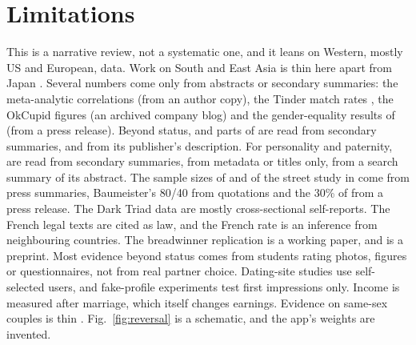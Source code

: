 \documentclass[conference,a4paper]{IEEEtran}
\begin{document}
\section{Limitations}
This is a narrative review, not a systematic one, and it leans on Western, mostly US and European, data. Work on South and East Asia is thin here apart from Japan \cite{raymo2005}. Several numbers come only from abstracts or secondary summaries: the meta-analytic correlations \cite{eastwick2014} (from an author copy), the Tinder match rates \cite{tyson2016}, the OkCupid figures \cite{rudder2009} (an archived company blog) and the gender-equality results of \cite{zentner2012} (from a press release). Beyond status, \cite{stulp2013paid,sorokowski2008,gignac2018,taylor2005} and parts of \cite{mautz2013} are read from secondary summaries, and \cite{curington2021} from its publisher's description. For personality and paternity, \cite{paulhus2002,jonason2015birds,holtzman2010,paulhus1998,jonason2010poach,brewer2015,burger1999,urbaniak2003,mcdaniel2005,marcinkowska2015} are read from secondary summaries, \cite{qureshi2016,lyons2016faces} from metadata or titles only, \cite{aitken2013} from a search summary of its abstract. The sample sizes of \cite{haslam2015} and of the street study in \cite{dufner2013} come from press summaries, Baumeister's 80/40 \cite{baumeister2010} from quotations and the 30\% of \cite{anderson2006} from a press release. The Dark Triad data are mostly cross-sectional self-reports. The French legal texts are cited as law, and the French rate is an inference from neighbouring countries. The breadwinner replication \cite{rosenberg2024} is a working paper, and \cite{xia2014} is a preprint. Most evidence beyond status comes from students rating photos, figures or questionnaires, not from real partner choice. Dating-site studies use self-selected users, and fake-profile experiments test first impressions only. Income is measured after marriage, which itself changes earnings. Evidence on same-sex couples is thin \cite{bailey1994,lippa2007,schwartz2009samesex}. Fig.~\ref{fig:reversal} is a schematic, and the app's weights are invented.
\end{document}
